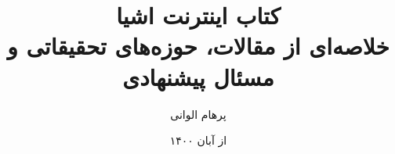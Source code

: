 \title{
  کتاب اینترنت اشیا\\
  \small{خلاصه‌ای از مقالات، حوزه‌های تحقیقاتی و مسئال پیشنهادی}
}
\author{پرهام الوانی}
\date{از آبان ۱۴۰۰}
\maketitle
